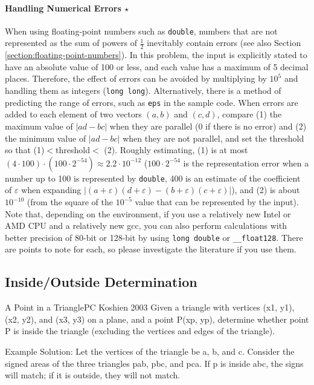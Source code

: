 \paragraph{Handling Numerical Errors $\star$}
When using floating-point numbers such as \texttt{double}, numbers that are not represented as the sum of powers of $\frac{1}{2}$ inevitably contain errors (see also Section \ref{section:floating-point-numbers}). In this problem, the input is explicitly stated to have an absolute value of 100 or less, and each value has a maximum of 5 decimal places. Therefore, the effect of errors can be avoided by multiplying by $10^5$ and handling them as integers (\texttt{long long}).
Alternatively, there is a method of predicting the range of errors, such as \texttt{eps} in the sample code.
When errors are added to each element of two vectors $(a,b)$ and $(c,d)$, compare (1) the maximum value of $|ad-bc|$ when they are parallel (0 if there is no error) and (2) the minimum value of $|ad-bc|$ when they are not parallel, and set the threshold so that (1)$<$threshold$<$ (2).
Roughly estimating, (1) is at most
$(4\cdot100)\cdot(100\cdot2^{-54})\approx2.2\cdot10^{-12}$
($100\cdot2^{-54}$ is the representation error when a number up to 100 is represented by \texttt{double}, 400 is
an estimate of the coefficient of $\varepsilon$ when expanding
$|(a+\varepsilon)(d+\varepsilon)-(b+\varepsilon)(c+\varepsilon)|$),
and (2) is about $10^{-10}$ (from the square of the $10^{-5}$ value that can be represented by the input).
Note that, depending on the environment, if you use a relatively new Intel or AMD CPU and a relatively new gcc, you can also perform calculations with better precision of 80-bit or 128-bit by using \texttt{long double} or \texttt{\_\_float128}. There are points to note for each, so please investigate the literature if you use them.
\subsection{Inside/Outside Determination}

\begin{psbox}{A Point in a Triangle}{PC Koshien 2003}
Given a triangle with vertices (x1, y1), (x2, y2), and (x3, y3) on a plane, and a point P(xp, yp), determine whether point P is inside the triangle (excluding the vertices and edges of the triangle).

\end{psbox}
    
Example Solution: Let the vertices of the triangle be a, b, and c. Consider the signed areas of the three triangles pab, pbc, and pca. If p is inside abc, the signs will match; if it is outside, they will not match.

